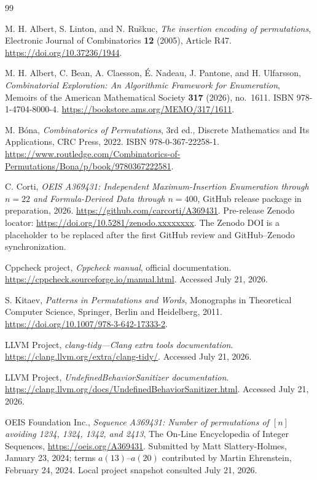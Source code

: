 \documentclass[11pt]{article}
\theoremstyle{definition}
\theoremstyle{remark}
\begin{document}
\clearpage
\begin{thebibliography}{99}
\sloppy
\raggedright

M. H. Albert, S. Linton, and N. Ru\v{s}kuc,
\emph{The insertion encoding of permutations},
Electronic Journal of Combinatorics \textbf{12} (2005), Article R47.
\url{https://doi.org/10.37236/1944}.

M. H. Albert, C. Bean, A. Claesson, \'E. Nadeau, J. Pantone, and
H. Ulfarsson,
\emph{Combinatorial Exploration: An Algorithmic Framework for Enumeration},
Memoirs of the American Mathematical Society \textbf{317} (2026), no.~1611.
ISBN 978-1-4704-8000-4.
\url{https://bookstore.ams.org/MEMO/317/1611}.

M. B\'ona,
\emph{Combinatorics of Permutations}, 3rd ed.,
Discrete Mathematics and Its Applications, CRC Press, 2022.
ISBN 978-0-367-22258-1.
\url{https://www.routledge.com/Combinatorics-of-Permutations/Bona/p/book/9780367222581}.

C. Corti,
\emph{OEIS A369431: Independent Maximum-Insertion Enumeration through
$n=22$ and Formula-Derived Data through $n=400$},
GitHub release package in preparation, 2026.
\url{https://github.com/carcorti/A369431}.
Pre-release Zenodo locator:
\url{https://doi.org/10.5281/zenodo.xxxxxxxx}.
The Zenodo DOI is a placeholder to be replaced after the first GitHub review
and GitHub--Zenodo synchronization.

Cppcheck project,
\emph{Cppcheck manual}, official documentation.
\url{https://cppcheck.sourceforge.io/manual.html}.
Accessed July 21, 2026.

S. Kitaev,
\emph{Patterns in Permutations and Words},
Monographs in Theoretical Computer Science, Springer, Berlin and Heidelberg,
2011.
\url{https://doi.org/10.1007/978-3-642-17333-2}.

LLVM Project,
\emph{clang-tidy---Clang extra tools documentation}.
\url{https://clang.llvm.org/extra/clang-tidy/}.
Accessed July 21, 2026.

LLVM Project,
\emph{UndefinedBehaviorSanitizer documentation}.
\url{https://clang.llvm.org/docs/UndefinedBehaviorSanitizer.html}.
Accessed July 21, 2026.

OEIS Foundation Inc.,
\emph{Sequence A369431: Number of permutations of $[n]$ avoiding 1234, 1324,
1342, and 2413},
The On-Line Encyclopedia of Integer Sequences,
\url{https://oeis.org/A369431}.
Submitted by Matt Slattery-Holmes, January 23, 2024; terms $a(13)$--$a(20)$
contributed by Martin Ehrenstein, February 24, 2024.  Local project snapshot
consulted July 21, 2026.


\end{thebibliography}
\end{document}
